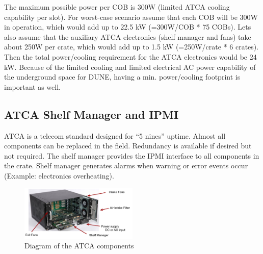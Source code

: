 The maximum possible power per COB is 300W (limited ATCA cooling capability per slot).  For worst-case scenario assume that each COB will be 300W in operation, which would add up to 22.5 kW (=300W/COB * 75 COBs).  Lets also assume that the auxiliary ATCA electronics (shelf manager and fans) take about 250W per crate, which would add up to 1.5 kW (=250W/crate * 6 crates). Then the total power/cooling requirement for the ATCA electronics would be 24 kW.  Because of the limited cooling and limited electrical AC power capability of the underground space for DUNE, having a min. power/cooling footprint is important as well. 

\subsection{ ATCA Shelf Manager and IPMI}

ATCA is a telecom standard designed for “5 nines” uptime.
Almost all components can be replaced in the field.
Redundancy is available if desired but not required.
The shelf manager provides the IPMI interface to all components in the crate. 
Shelf manager generates alarms when warning or error events occur
(Example: electronics overheating). 

\begin{figure}[tb]
\centering
\includegraphics[width=0.5\textwidth]{images/ATCA_Components.png}
\caption{\label{fig:ATCA_Components}Diagram of the ATCA components}
\end{figure}

